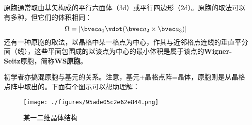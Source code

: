 原胞通常取由基矢构成的平行六面体（3d）或平行四边形（2d）。原胞的取法可以有多种，但它们的体积相同：
\begin{equation}
\Omega = |\bvec a_1 \vdot ( \bvec a_2 \times \bvec a_3)|
\end{equation}
还有一种原胞的取法，以晶格中某一格点为中心，作其与近邻格点连线的垂直平分面（线），这些平面包围成的以该点为中心的最小体积是属于该点的\textbf{Wigner-Seitz}原胞，简称\textbf{WS原胞}。

初学者亦搞混原胞与基元的关系。注意，基元+晶格点阵=晶体，原胞则是从晶格点阵中取出的。下面有个图示可以帮助理解：
\begin{figure}[ht]
\centering
\texttt{[image: ./figures/95ade05c2e62e844.png]}
\caption{某一二维晶体结构 } \label{fig_BraLat_4}
\end{figure}
